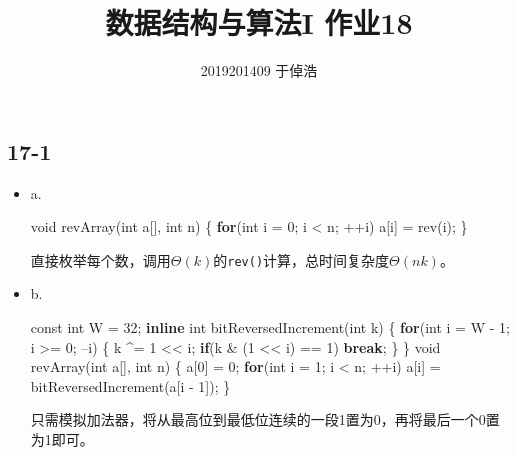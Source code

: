 \documentclass[]{article}
\title{数据结构与算法I 作业18}
\author{2019201409 于倬浩}
\newenvironment{Shaded}{}{}
\newcommand{\AttributeTok}[1]{\textcolor[rgb]{0.49,0.56,0.16}{#1}}
\newcommand{\ControlFlowTok}[1]{\textcolor[rgb]{0.00,0.44,0.13}{\textbf{#1}}}
\newcommand{\DataTypeTok}[1]{\textcolor[rgb]{0.56,0.13,0.00}{#1}}
\newcommand{\DecValTok}[1]{\textcolor[rgb]{0.25,0.63,0.44}{#1}}
\newcommand{\KeywordTok}[1]{\textcolor[rgb]{0.00,0.44,0.13}{\textbf{#1}}}
\newcommand{\NormalTok}[1]{#1}
\begin{document}
\maketitle

\hypertarget{header-n26}{%
\subsection{17-1}\label{header-n26}}

\begin{itemize}
\item
  a.

\begin{Shaded}
\begin{Highlighting}[]
\DataTypeTok{void}\NormalTok{ revArray(}\DataTypeTok{int}\NormalTok{ a[], }\DataTypeTok{int}\NormalTok{ n) \{}
    \ControlFlowTok{for}\NormalTok{(}\DataTypeTok{int}\NormalTok{ i = }\DecValTok{0}\NormalTok{; i < n; ++i)}
\NormalTok{        a[i] = rev(i);}
\NormalTok{\}}
\end{Highlighting}
\end{Shaded}

  直接枚举每个数，调用\(\Theta(k)\)的\texttt{rev()}计算，总时间复杂度\(\Theta(nk)\)。
\item
  b.

\begin{Shaded}
\begin{Highlighting}[]
\AttributeTok{const} \DataTypeTok{int}\NormalTok{ W = }\DecValTok{32}\NormalTok{;}
\KeywordTok{inline} \DataTypeTok{int}\NormalTok{ bitReversedIncrement(}\DataTypeTok{int}\NormalTok{ k) \{}
    \ControlFlowTok{for}\NormalTok{(}\DataTypeTok{int}\NormalTok{ i = W - }\DecValTok{1}\NormalTok{; i >= }\DecValTok{0}\NormalTok{; --i) \{}
\NormalTok{        k ^= }\DecValTok{1}\NormalTok{ << i;}
        \ControlFlowTok{if}\NormalTok{(k & (}\DecValTok{1}\NormalTok{ << i) == }\DecValTok{1}\NormalTok{) }
            \ControlFlowTok{break}\NormalTok{;}
\NormalTok{    \}}
\NormalTok{\}}
\DataTypeTok{void}\NormalTok{ revArray(}\DataTypeTok{int}\NormalTok{ a[], }\DataTypeTok{int}\NormalTok{ n) \{}
\NormalTok{    a[}\DecValTok{0}\NormalTok{] = }\DecValTok{0}\NormalTok{;}
    \ControlFlowTok{for}\NormalTok{(}\DataTypeTok{int}\NormalTok{ i = }\DecValTok{1}\NormalTok{; i < n; ++i)}
\NormalTok{        a[i] = bitReversedIncrement(a[i - }\DecValTok{1}\NormalTok{]);}
\NormalTok{\}}
\end{Highlighting}
\end{Shaded}

  只需模拟加法器，将从最高位到最低位连续的一段1置为0，再将最后一个0置为1即可。


\end{itemize}
\end{document}
